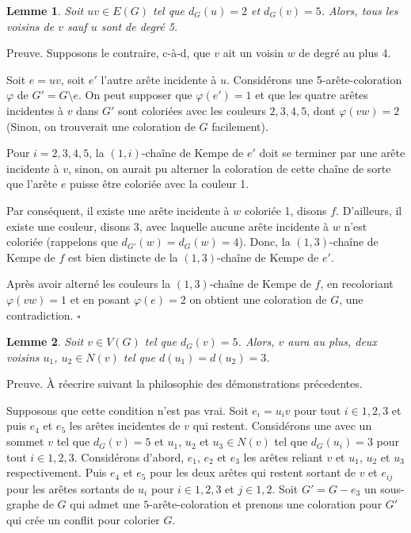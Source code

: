 \documentclass[10pt,a4paper]{article}
\newtheorem{lemme}{Lemme}
\newcommand{\ep}{{\hfill $\square$}}
\begin{document}
\begin{lemme}
Soit $uv \in E(G)$ tel que $d_G(u) = 2$ et $d_G(v) = 5$. Alors, tous les voisins de $v$ sauf $u$ sont de degré 5. 
\label{le:254}
\end{lemme}

Preuve. 
Supposons le contraire, c-à-d, que $v$ ait un voisin $w$ de degré au plus 4.

Soit $e=uv$, soit $e'$ l'autre arête incidente à $u$.
Considérons une 5-arête-coloration $\varphi$ de $G'=G \setminus e$. On peut supposer que $\varphi(e')=1$ et que les quatre arêtes incidentes à $v$ dans $G'$ sont coloriées avec les couleurs $2,3,4,5$, dont $\varphi(vw)=2$ (Sinon, on trouverait une coloration de $G$ facilement).

Pour $i=2,3,4,5$, la $(1,i)$-chaîne de Kempe de $e'$ doit se terminer par une arête incidente à $v$, sinon, on aurait pu alterner la coloration de cette chaîne de sorte que l'arête $e$ puisse être coloriée avec la couleur 1. 

Par conséquent, il existe une arête incidente à $w$ coloriée 1, disons $f$. D'ailleurs, il existe une couleur, disons 3, avec laquelle aucune arête incidente à $w$ n'est coloriée (rappelons que $d_{G'}(w)=d_G(w)=4$). Donc, la $(1,3)$-chaîne de Kempe de $f$ est bien distincte de la $(1,3)$-chaîne de Kempe de $e'$.

Après avoir alterné les couleurs la $(1,3)$-chaîne de Kempe de $f$, en recoloriant $\varphi(vw)=1$ et en posant $\varphi(e)=2$ on obtient une coloration de $G$, une contradiction. \ep

\begin{lemme}
Soit $v \in V(G)$ tel que $d_G(v) = 5$. Alors, $v$ aura au plus, deux voisins $u_1$, $u_2 \in N(v)$ tel que $d(u_1) = d(u_2) = 3$.
\label{le:5333}
\end{lemme}


Preuve.
{\color{blue} À réecrire suivant la philosophie des démonstrations précedentes.}

Supposons que cette condition n'est pas vrai. Soit $e_i = u_iv$ pour tout $i \in {1,2,3}$ et puis $e_4$ et $e_5$ les arêtes incidentes de $v$ qui restent. Considérons une  avec un sommet $v$ tel que $d_G(v) = 5$ et $u_1$, $u_2$ et $u_3 \in N(v)$ tel que $d_G(u_i) = 3$ pour tout $i \in {1,2,3}$. Considérons d'abord, $e_1$, $e_2$ et $e_3$ les arêtes reliant $v$ et $u_1$, $u_2$ et $u_3$ respectivement. Puis $e_4$ et $e_5$ pour les deux arêtes qui restent sortant de $v$ et $e_{ij}$ pour les arêtes sortants de $u_i$ pour $i \in {1,2,3}$ et $ j \in {1,2}$. Soit $G' = G- e_3$ un sous-graphe de $G$ qui admet une $5$-arête-coloration et prenons une coloration pour $G'$ qui crée un conflit pour colorier $G$. 
\end{document}
